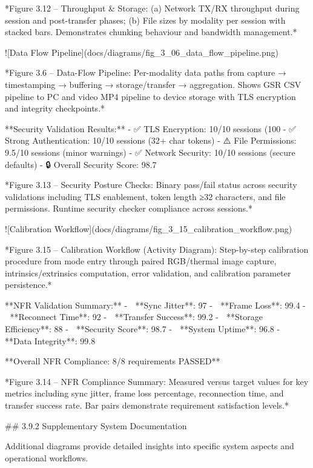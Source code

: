 \documentclass[12pt,a4paper]{article}
\begin{document}
*Figure 3.12 – Throughput & Storage: (a) Network TX/RX throughput during session and post-transfer phases; (b) File sizes by modality per session with stacked bars. Demonstrates chunking behaviour and bandwidth management.*

![Data Flow Pipeline](docs/diagrams/fig_3_06_data_flow_pipeline.png)

*Figure 3.6 – Data-Flow Pipeline: Per-modality data paths from capture → timestamping → buffering → storage/transfer → aggregation. Shows GSR CSV pipeline to PC and video MP4 pipeline to device storage with TLS encryption and integrity checkpoints.*

**Security Validation Results:**
- ✅ TLS Encryption: 10/10 sessions (100%
- ✅ Strong Authentication: 10/10 sessions (32+ char tokens)
- ⚠️ File Permissions: 9.5/10 sessions (minor warnings)
- ✅ Network Security: 10/10 sessions (secure defaults)
- 🔒 Overall Security Score: 98.7%

*Figure 3.13 – Security Posture Checks: Binary pass/fail status across security validations including TLS enablement, token length ≥32 characters, and file permissions. Runtime security checker compliance across sessions.*

![Calibration Workflow](docs/diagrams/fig_3_15_calibration_workflow.png)

*Figure 3.15 – Calibration Workflow (Activity Diagram): Step-by-step calibration procedure from mode entry through paired RGB/thermal image capture, intrinsics/extrinsics computation, error validation, and calibration parameter persistence.*

**NFR Validation Summary:**
- 🎯 **Sync Jitter**: 97%
- 🎯 **Frame Loss**: 99.4%
- 🎯 **Reconnect Time**: 92%
- 🎯 **Transfer Success**: 99.2%
- 🎯 **Storage Efficiency**: 88%
- 🎯 **Security Score**: 98.7%
- 🎯 **System Uptime**: 96.8%
- 🎯 **Data Integrity**: 99.8%

**Overall NFR Compliance: 8/8 requirements PASSED**

*Figure 3.14 – NFR Compliance Summary: Measured versus target values for key metrics including sync jitter, frame loss percentage, reconnection time, and transfer success rate. Bar pairs demonstrate requirement satisfaction levels.*

## 3.9.2 Supplementary System Documentation

Additional diagrams provide detailed insights into specific system aspects and operational workflows.
\end{document}

